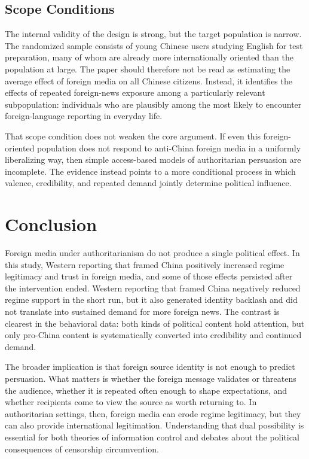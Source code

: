 \documentclass[12pt,american]{article}
\begin{document}
	\subsection*{Scope Conditions}
	
	The internal validity of the design is strong, but the target population is narrow. The randomized sample consists of young Chinese users studying English for test preparation, many of whom are already more internationally oriented than the population at large. The paper should therefore not be read as estimating the average effect of foreign media on all Chinese citizens. Instead, it identifies the effects of repeated foreign-news exposure among a particularly relevant subpopulation: individuals who are plausibly among the most likely to encounter foreign-language reporting in everyday life.
	
	That scope condition does not weaken the core argument. If even this foreign-oriented population does not respond to anti-China foreign media in a uniformly liberalizing way, then simple access-based models of authoritarian persuasion are incomplete. The evidence instead points to a more conditional process in which valence, credibility, and repeated demand jointly determine political influence.
	
	\section*{Conclusion}
	
	Foreign media under authoritarianism do not produce a single political effect. In this study, Western reporting that framed China positively increased regime legitimacy and trust in foreign media, and some of those effects persisted after the intervention ended. Western reporting that framed China negatively reduced regime support in the short run, but it also generated identity backlash and did not translate into sustained demand for more foreign news. The contrast is clearest in the behavioral data: both kinds of political content hold attention, but only pro-China content is systematically converted into credibility and continued demand.
	
	The broader implication is that foreign source identity is not enough to predict persuasion. What matters is whether the foreign message validates or threatens the audience, whether it is repeated often enough to shape expectations, and whether recipients come to view the source as worth returning to. In authoritarian settings, then, foreign media can erode regime legitimacy, but they can also provide international legitimation. Understanding that dual possibility is essential for both theories of information control and debates about the political consequences of censorship circumvention.
	
\end{document}

